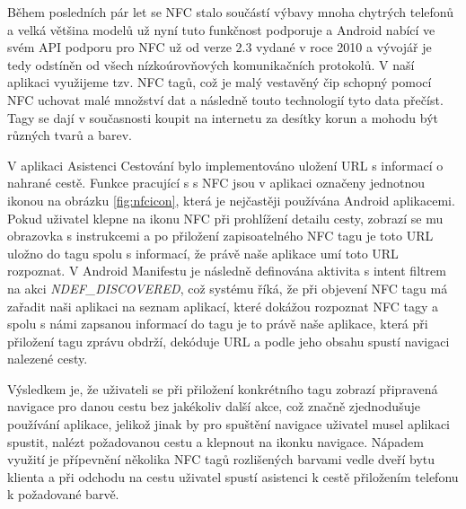 \documentclass{article}
\begin{document}
Během posledních pár let se NFC stalo součástí výbavy mnoha chytrých telefonů a velká většina modelů
už nyní tuto funkčnost podporuje a Android nabící ve svém API podporu pro NFC už od verze 2.3
vydané v roce 2010 a vývojář je tedy odstíněn od všech nízkoúrovňových komunikačních protokolů.
V naší aplikaci využijeme tzv. NFC tagů, což je malý vestavěný čip schopný pomocí NFC uchovat malé množství dat a
následně touto technologií tyto data přečíst. Tagy se dají v současnosti koupit na internetu za desítky
korun a mohodu být různých tvarů a barev.

V aplikaci Asistenci Cestování bylo implementováno uložení URL s informací o nahrané cestě. Funkce
pracující s s NFC jsou v aplikaci označeny jednotnou ikonou na obrázku \ref{fig:nfcicon},
která je nejčastěji používána Android aplikacemi.
 Pokud uživatel klepne na ikonu NFC při prohlížení detailu cesty, zobrazí se mu obrazovka s instrukcemi a po přiložení
zapisoatelného NFC tagu je toto URL uložno do tagu spolu s informací, že právě naše aplikace umí toto URL
rozpoznat. V Android Manifestu je následně definována aktivita s intent filtrem na akci \textit{NDEF\_DISCOVERED},
což systému říká, že při objevení NFC tagu má zařadit naši aplikaci na seznam aplikací, které dokážou
rozpoznat NFC tagy a spolu s námi zapsanou informací do tagu je to právě naše aplikace, která při přiložení
tagu zprávu obdrží, dekóduje URL a podle jeho obsahu spustí navigaci nalezené cesty.

Výsledkem je, že uživateli se při přiložení konkrétního tagu zobrazí připravená navigace pro danou
cestu bez jakékoliv další akce, což značně zjednodušuje používání aplikace, jelikož jinak by pro spuštění navigace
uživatel musel aplikaci spustit, nalézt požadovanou cestu a klepnout na ikonku navigace. Nápadem
 využití je přípevnění několika NFC tagů rozlišených barvami vedle dveří bytu klienta a při odchodu na
 cestu uživatel spustí asistenci k cestě přiložením telefonu k požadované barvě.
\end{document}
